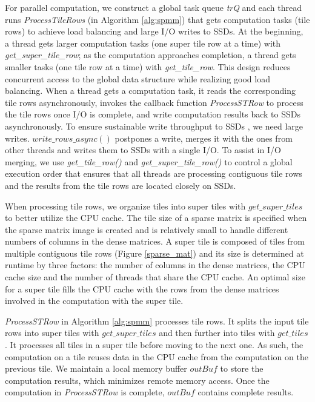 For parallel computation, we construct a global task queue \textit{trQ}
and each thread runs \textit{ProcessTileRows} (in Algorithm \ref{alg:spmm})
that gets computation tasks (tile rows) to achieve load balancing and large
I/O writes to SSDs.
At the beginning, a thread gets larger computation tasks (one super tile row at
a time) with \textit{get\_super\_tile\_row}; as the computation approaches
completion, a thread gets smaller tasks (one tile row at a time) with
\textit{get\_tile\_row}. This design reduces concurrent access to
the global data structure while realizing good load balancing. When a thread
gets a computation task, it reads the corresponding tile rows asynchronously,
invokes the callback function \textit{ProcessSTRow} to process the tile rows
once I/O is complete, and write computation results back to SSDs asynchronously.
To ensure sustainable write throughput to SSDs \cite{sfs}, we need large writes.
$write\_rows\_async()$ postpones a write, merges it with
the ones from other threads and writes them to SSDs with a single I/O.
To assist in I/O merging, we use \textit{get\_tile\_row()} and
\textit{get\_super\_tile\_row()} to control a global execution order that
ensures that all threads are processing contiguous tile rows and the results
from the tile rows are located closely on SSDs.

When processing tile rows, we organize tiles into super tiles with
$get\_super\_tiles$ to better utilize the CPU cache. The tile size of a sparse
matrix is specified when the sparse matrix image is created and is relatively
small to handle different numbers of columns in the dense matrices. A super tile
is composed of tiles from multiple contiguous tile rows (Figure \ref{sparse_mat})
and its size is determined at runtime by three factors: the number of columns
in the dense matrices, the CPU cache size and the number of threads that
share the CPU cache. An optimal size for a super tile fills
the CPU cache with the rows from the dense matrices involved in
the computation with the super tile.

\textit{ProcessSTRow} in Algorithm \ref{alg:spmm} processes tile rows.
It splits the input tile rows into super tiles with $get\_super\_tiles$ and
then further into tiles with $get\_tiles$. It processes all tiles in a super
tile before moving to the next one. As such, the computation on a tile reuses
data in the CPU cache from the computation on the previous tile. We maintain
a local memory buffer $outBuf$ to store the computation results,
which minimizes remote memory access. Once the computation in \textit{ProcessSTRow}
is complete, $outBuf$ contains complete results.

